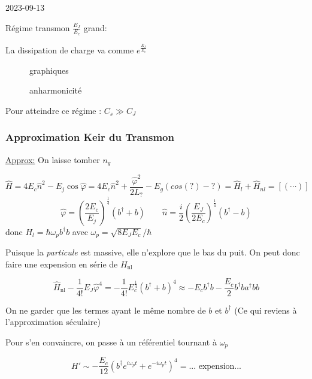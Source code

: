 


2023-09-13

Régime transmon $\frac{E_J }{E_c } $ grand:

La dissipation de charge va comme $e^{\frac{E_J }{E_c } }$

\begin{figure}[ht]
    \centering
    \caption{graphiques}
    \label{fig:graphiques}
\end{figure}


\begin{figure}[ht]
    \centering
    \caption{anharmonicité}
    \label{fig:anharmonicité}
\end{figure}

Pour atteindre ce régime : $C_s \gg C_J$


\setcounter{section}{3}
\setcounter{subsection}{2}

\subsubsection{Approximation Keir du Transmon}

\underline{Approx:} On laisse tomber $n_g$

\[  \hat H = 4 E_c \hat n^{2}- E_j \cos \hat \varphi = 4E_c \hat n^{2}+ \frac{\hat \varphi^2}{2L_? } - E_g \left( cos( ? ) - ? \right)  = \hat H_{l} + \hat H_{nl} = \left[ \left( \dotsb \right)  \right]   \]
\[ \hat \varphi = \left( \frac{2E_{c}}{E_j}    \right) ^{\frac{1}{4} }\left( b ^{\dagger} + b \right) \qquad \hat n = \frac{i}{2} \left( \frac{E_{J}}{2E_c}  \right)^{\frac{1}{4} } \left( b^{\dagger} - b \right)   \]
donc $H_l = \hbar \omega_p b^{\dagger} b$ avec $\omega_p = \sqrt{8 E_J E_c}/\hbar$


Puisque la \textit{particule} est massive, elle n'explore que le bas du puit. On peut donc faire une expension en série de $H_{\text{nl}} $

\[ \hat H_{\text{nl}} - \frac{1}{4!} E_J \hat \varphi^{4}= - \frac{1}{4!} E_c^{\frac{1}{4} } \left( b^{\dagger} + b \right)^4 \approx - E_c b^{\dagger} b - \frac{E_c}{2} b^{\dagger} ba^{\dagger} bb \]

On ne garder que les termes ayant le même nombre de $b$ et $b^{\dagger}$ (Ce qui reviens à l'approximation séculaire)

Pour s'en convaincre, on passe à un référentiel tournant à $\omega_p$

\[ H' \sim - \frac{E_c}{12} \left( b^{\dagger} e^{i\omega_p t}  + e^{-i\omega_p t} \right)^4 = \text{... expension...}  \]

